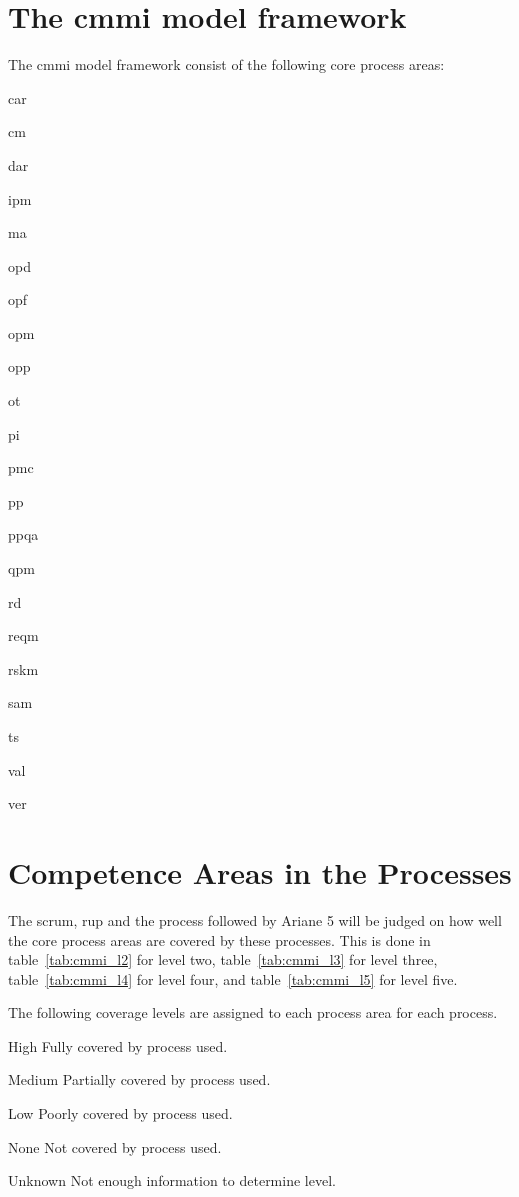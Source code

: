 \section{The \acs{cmmi} model framework}
The \ac{cmmi} model framework consist of the following core process areas:
\begin{compactitem}
    \item \ac{car}
    \item \ac{cm}
    \item \ac{dar}
    \item \ac{ipm}
    \item \ac{ma}
    \item \ac{opd}
    \item \ac{opf}
    \item \ac{opm}
    \item \ac{opp}
    \item \ac{ot}
    \item \ac{pi}
    \item \ac{pmc}
    \item \ac{pp}
    \item \ac{ppqa}
    \item \ac{qpm}
    \item \ac{rd}
    \item \ac{reqm}
    \item \ac{rskm}
    \item \ac{sam}
    \item \ac{ts}
    \item \ac{val}
    \item \ac{ver}
\end{compactitem}

\section{Competence Areas in the Processes}
The \ac{scrum}, \ac{rup} and the process followed by Ariane 5 will be judged on how well the core process areas are covered by these processes. 
This is done in table~\ref{tab:cmmi_l2} for level two, table~\ref{tab:cmmi_l3} for level three, table~\ref{tab:cmmi_l4} for level four, and table~\ref{tab:cmmi_l5} for level five.

The following coverage levels are assigned to each process area for each process.
\begin{compactdesc}
\item[High] Fully covered by process used.
\item[Medium] Partially covered by process used.
\item[Low] Poorly covered by process used.
\item[None] Not covered by process used.
\item[Unknown] Not enough information to determine level.
\end{compactdesc}

